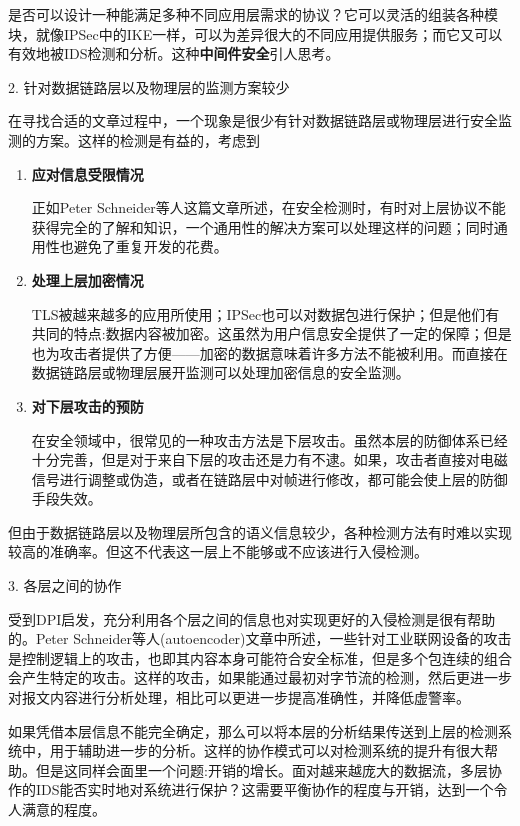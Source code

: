 \documentclass[12pt]{article} %
\begin{document}
是否可以设计一种能满足多种不同应用层需求的协议？它可以灵活的组装各种模块，就像IPSec中的IKE一样，可以为差异很大的不同应用提供服务；而它又可以有效地被IDS检测和分析。这种\textbf{中间件安全}引人思考。

2. 针对数据链路层以及物理层的监测方案较少

在寻找合适的文章过程中，一个现象是很少有针对数据链路层或物理层进行安全监测的方案。这样的检测是有益的，考虑到

\begin{enumerate}
    \item \textbf{应对信息受限情况}

    正如Peter Schneider等人这篇文章所述，在安全检测时，有时对上层协议不能获得完全的了解和知识，一个通用性的解决方案可以处理这样的问题；同时通用性也避免了重复开发的花费。

    \item \textbf{处理上层加密情况}

    TLS被越来越多的应用所使用；IPSec也可以对数据包进行保护；但是他们有共同的特点:数据内容被加密。这虽然为用户信息安全提供了一定的保障；但是也为攻击者提供了方便——加密的数据意味着许多方法不能被利用。而直接在数据链路层或物理层展开监测可以处理加密信息的安全监测。

    \item \textbf{对下层攻击的预防}

    在安全领域中，很常见的一种攻击方法是下层攻击。虽然本层的防御体系已经十分完善，但是对于来自下层的攻击还是力有不逮。如果，攻击者直接对电磁信号进行调整或伪造，或者在链路层中对帧进行修改，都可能会使上层的防御手段失效。
\end{enumerate}

但由于数据链路层以及物理层所包含的语义信息较少，各种检测方法有时难以实现较高的准确率。但这不代表这一层上不能够或不应该进行入侵检测。

3. 各层之间的协作

受到DPI启发，充分利用各个层之间的信息也对实现更好的入侵检测是很有帮助的。Peter Schneider等人(autoencoder)文章中所述，一些针对工业联网设备的攻击是控制逻辑上的攻击，也即其内容本身可能符合安全标准，但是多个包连续的组合会产生特定的攻击。这样的攻击，如果能通过最初对字节流的检测，然后更进一步对报文内容进行分析处理，相比可以更进一步提高准确性，并降低虚警率。

如果凭借本层信息不能完全确定，那么可以将本层的分析结果传送到上层的检测系统中，用于辅助进一步的分析。这样的协作模式可以对检测系统的提升有很大帮助。但是这同样会面里一个问题:开销的增长。面对越来越庞大的数据流，多层协作的IDS能否实时地对系统进行保护？这需要平衡协作的程度与开销，达到一个令人满意的程度。
\end{document}
